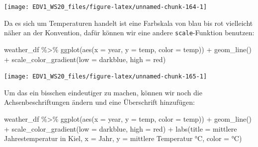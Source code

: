 \documentclass[
]{book}
\newenvironment{Shaded}{\begin{snugshade}}{\end{snugshade}}
\newcommand{\AttributeTok}[1]{\textcolor[rgb]{0.77,0.63,0.00}{#1}}
\newcommand{\FunctionTok}[1]{\textcolor[rgb]{0.00,0.00,0.00}{#1}}
\newcommand{\NormalTok}[1]{#1}
\newcommand{\SpecialCharTok}[1]{\textcolor[rgb]{0.00,0.00,0.00}{#1}}
\newcommand{\StringTok}[1]{\textcolor[rgb]{0.31,0.60,0.02}{#1}}
\begin{document}
\begin{center}\texttt{[image: EDV1\_WS20\_files/figure-latex/unnamed-chunk-164-1]} \end{center}

Da es sich um Temperaturen handelt ist eine Farbskala von blau bis rot vielleicht näher an der Konvention, dafür können wir eine andere \texttt{scale}-Funktion benutzen:

\begin{Shaded}
\begin{Highlighting}[]
\NormalTok{weather\_df }\SpecialCharTok{\%\textgreater{}\%} 
  \FunctionTok{ggplot}\NormalTok{(}\FunctionTok{aes}\NormalTok{(}\AttributeTok{x =}\NormalTok{ year,}
             \AttributeTok{y =}\NormalTok{ temp,}
             \AttributeTok{color =}\NormalTok{ temp)) }\SpecialCharTok{+}
  \FunctionTok{geom\_line}\NormalTok{() }\SpecialCharTok{+}
  \FunctionTok{scale\_color\_gradient}\NormalTok{(}\AttributeTok{low =} \StringTok{\textquotesingle{}darkblue\textquotesingle{}}\NormalTok{,}
                       \AttributeTok{high =} \StringTok{\textquotesingle{}red\textquotesingle{}}\NormalTok{)}
\end{Highlighting}
\end{Shaded}

\begin{center}\texttt{[image: EDV1\_WS20\_files/figure-latex/unnamed-chunk-165-1]} \end{center}

Um das ein bisschen eindeutiger zu machen, können wir noch die Achsenbeschriftungen ändern und eine Überschrift hinzufügen:

\begin{Shaded}
\begin{Highlighting}[]
\NormalTok{weather\_df }\SpecialCharTok{\%\textgreater{}\%} 
  \FunctionTok{ggplot}\NormalTok{(}\FunctionTok{aes}\NormalTok{(}\AttributeTok{x =}\NormalTok{ year,}
             \AttributeTok{y =}\NormalTok{ temp,}
             \AttributeTok{color =}\NormalTok{ temp)) }\SpecialCharTok{+}
  \FunctionTok{geom\_line}\NormalTok{() }\SpecialCharTok{+}
  \FunctionTok{scale\_color\_gradient}\NormalTok{(}\AttributeTok{low =} \StringTok{\textquotesingle{}darkblue\textquotesingle{}}\NormalTok{,}
                       \AttributeTok{high =} \StringTok{\textquotesingle{}red\textquotesingle{}}\NormalTok{) }\SpecialCharTok{+}
  \FunctionTok{labs}\NormalTok{(}\AttributeTok{title =} \StringTok{\textquotesingle{}mittlere Jahrestemperatur in Kiel\textquotesingle{}}\NormalTok{,}
       \AttributeTok{x =} \StringTok{\textquotesingle{}Jahr\textquotesingle{}}\NormalTok{,}
       \AttributeTok{y =} \StringTok{\textquotesingle{}mittlere Temperatur °C\textquotesingle{}}\NormalTok{,}
       \AttributeTok{color =} \StringTok{\textquotesingle{}°C\textquotesingle{}}\NormalTok{)}
\end{Highlighting}
\end{Shaded}
\end{document}
